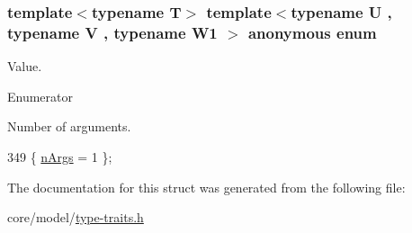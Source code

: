 \subsubsection[{\texorpdfstring{anonymous enum}{anonymous enum}}]{\setlength{\rightskip}{0pt plus 5cm}template$<$typename T$>$ template$<$typename U , typename V , typename W1 $>$ anonymous enum}\hypertarget{structTypeTraits_1_1PtrToMemberTraits_3_01U_07V_1_1_5_08_07W1_08_01const_01_01_4_aabfa84aba11641ee5ef6d4d1392f298d}{}\label{structTypeTraits_1_1PtrToMemberTraits_3_01U_07V_1_1_5_08_07W1_08_01const_01_01_4_aabfa84aba11641ee5ef6d4d1392f298d}
Value. \begin{Desc}
\item[Enumerator]\par
\begin{description}
\item[{\em 
n\+Args\hypertarget{structTypeTraits_1_1PtrToMemberTraits_3_01U_07V_1_1_5_08_07W1_08_01const_01_01_4_aabfa84aba11641ee5ef6d4d1392f298da08e8ca286437c0039fdf0b0a5bf06482}{}\label{structTypeTraits_1_1PtrToMemberTraits_3_01U_07V_1_1_5_08_07W1_08_01const_01_01_4_aabfa84aba11641ee5ef6d4d1392f298da08e8ca286437c0039fdf0b0a5bf06482}
}]Number of arguments. \end{description}
\end{Desc}

\begin{DoxyCode}
349 \{ \hyperlink{structTypeTraits_1_1PtrToMemberTraits_3_01U_07V_1_1_5_08_07W1_08_01const_01_01_4_aabfa84aba11641ee5ef6d4d1392f298da08e8ca286437c0039fdf0b0a5bf06482}{nArgs} = 1                \};
\end{DoxyCode}


The documentation for this struct was generated from the following file\+:\begin{DoxyCompactItemize}
\item 
core/model/\hyperlink{type-traits_8h}{type-\/traits.\+h}\end{DoxyCompactItemize}
